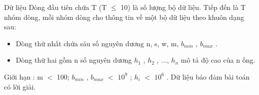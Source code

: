 Dữ liệu
Dòng đầu tiên chứa T (T $\le$ 10) là số lượng bộ dữ liệu. Tiếp đến là T nhóm dòng, mỗi nhóm dòng cho thông tin về một bộ dữ liệu theo khuôn dạng sau:
\begin{itemize}
	\item Dòng thứ nhất chứa sáu số nguyên dương n, s, w, m, $b_{min}$ , $b_{max}$ .
	\item Dòng thứ hai gồm n số nguyên dương $h_{1}$ , $h_{2}$ , ..., $h_{n}$ mô tả độ cao của n ống.
\end{itemize}

Giới hạn : m $<$ 100; $b_{min}$ , $b_{max}$ $<$ $10^{9}$ ; $h_{i}$ $<$ $10^{6}$ . Dữ liệu bảo đảm bài toán có lời giải.
\begin{itemize}
\end{itemize}